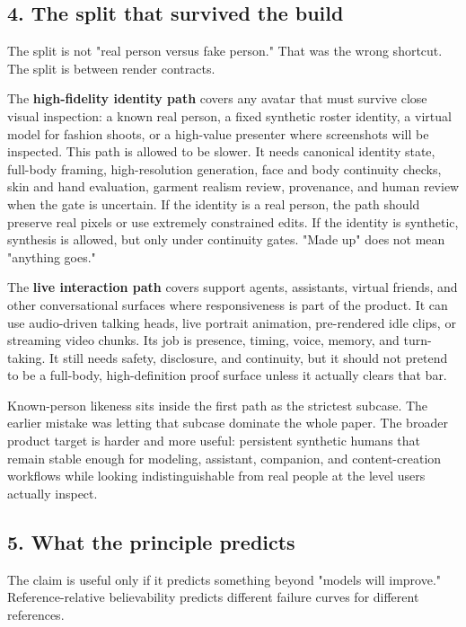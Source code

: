 \documentclass[
]{article}
\begin{document}
\subsection{4. The split that survived the
build}\label{4-the-split-that-survived-the-build}

The split is not "real person versus fake person." That was the wrong
shortcut. The split is between render contracts.

The \textbf{high-fidelity identity path} covers any avatar that must
survive close visual inspection: a known real person, a fixed synthetic
roster identity, a virtual model for fashion shoots, or a high-value
presenter where screenshots will be inspected. This path is allowed to
be slower. It needs canonical identity state, full-body framing,
high-resolution generation, face and body continuity checks, skin and
hand evaluation, garment realism review, provenance, and human review
when the gate is uncertain. If the identity is a real person, the path
should preserve real pixels or use extremely constrained edits. If the
identity is synthetic, synthesis is allowed, but only under continuity
gates. "Made up" does not mean "anything goes."

The \textbf{live interaction path} covers support agents, assistants,
virtual friends, and other conversational surfaces where responsiveness
is part of the product. It can use audio-driven talking heads, live
portrait animation, pre-rendered idle clips, or streaming video chunks.
Its job is presence, timing, voice, memory, and turn-taking. It still
needs safety, disclosure, and continuity, but it should not pretend to
be a full-body, high-definition proof surface unless it actually clears
that bar.

Known-person likeness sits inside the first path as the strictest
subcase. The earlier mistake was letting that subcase dominate the whole
paper. The broader product target is harder and more useful: persistent
synthetic humans that remain stable enough for modeling, assistant,
companion, and content-creation workflows while looking
indistinguishable from real people at the level users actually inspect.

\subsection{5. What the principle
predicts}\label{5-what-the-principle-predicts}

The claim is useful only if it predicts something beyond "models will
improve." Reference-relative believability predicts different failure
curves for different references.
\end{document}
